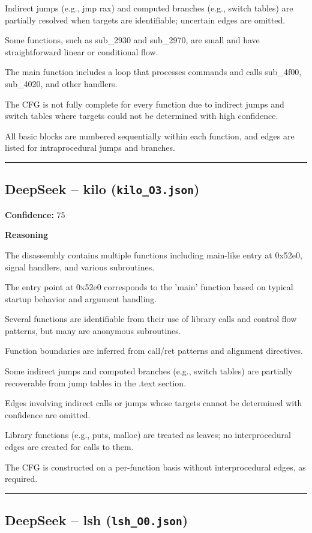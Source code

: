 Indirect jumps (e.g., jmp rax) and computed branches (e.g., switch tables) are partially resolved when targets are identifiable; uncertain edges are omitted.

Some functions, such as sub\_2930 and sub\_2970, are small and have straightforward linear or conditional flow.

The main function includes a loop that processes commands and calls sub\_4f00, sub\_4020, and other handlers.

The CFG is not fully complete for every function due to indirect jumps and switch tables where targets could not be determined with high confidence.

All basic blocks are numbered sequentially within each function, and edges are listed for intraprocedural jumps and branches.

\bigskip
\hrule
\bigskip

\subsection{DeepSeek -- kilo (\texttt{kilo\_O3.json})}

\textbf{Confidence:} 75

\textbf{Reasoning}

The disassembly contains multiple functions including main-like entry at 0x52e0, signal handlers, and various subroutines.

The entry point at 0x52e0 corresponds to the 'main' function based on typical startup behavior and argument handling.

Several functions are identifiable from their use of library calls and control flow patterns, but many are anonymous subroutines.

Function boundaries are inferred from call/ret patterns and alignment directives.

Some indirect jumps and computed branches (e.g., switch tables) are partially recoverable from jump tables in the .text section.

Edges involving indirect calls or jumps whose targets cannot be determined with confidence are omitted.

Library functions (e.g., puts, malloc) are treated as leaves; no interprocedural edges are created for calls to them.

The CFG is constructed on a per-function basis without interprocedural edges, as required.

\bigskip
\hrule
\bigskip

\subsection{DeepSeek -- lsh (\texttt{lsh\_O0.json})}

